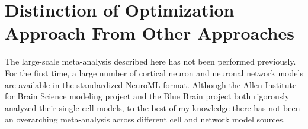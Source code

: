 










\section{Distinction of Optimization Approach From Other Approaches}
The large-scale meta-analysis described here has not been performed previously. For the first time, a large number of cortical neuron and neuronal network models are available in the standardized NeuroML format. Although the Allen Institute for Brain Science modeling project and the Blue Brain project both rigorously analyzed their single cell models, to the best of my knowledge there has not been an overarching meta-analysis across different cell and network model sources.\\

